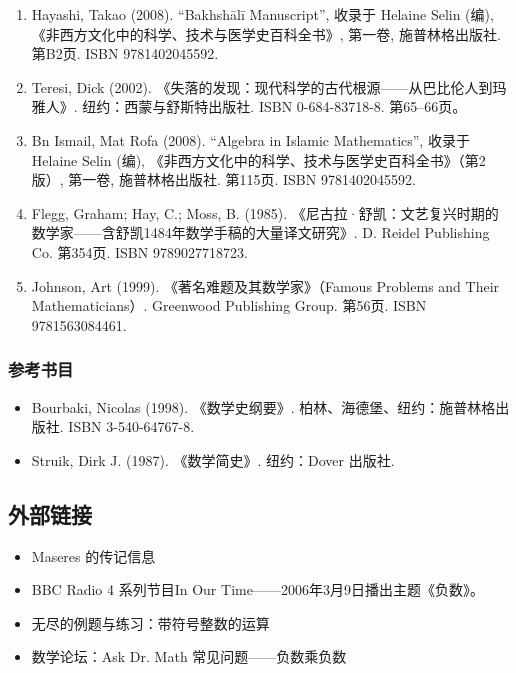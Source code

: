 \begin{enumerate}
\item Hayashi, Takao (2008). “Bakhshālī Manuscript”, 收录于 Helaine Selin (编), 《非西方文化中的科学、技术与医学史百科全书》, 第一卷, 施普林格出版社. 第B2页. ISBN 9781402045592.
\item Teresi, Dick (2002). 《失落的发现：现代科学的古代根源——从巴比伦人到玛雅人》. 纽约：西蒙与舒斯特出版社. ISBN 0-684-83718-8. 第65–66页。
\item Bn Ismail, Mat Rofa (2008). “Algebra in Islamic Mathematics”, 收录于 Helaine Selin (编), 《非西方文化中的科学、技术与医学史百科全书》（第2版）, 第一卷, 施普林格出版社. 第115页. ISBN 9781402045592.
\item Flegg, Graham; Hay, C.; Moss, B. (1985). 《尼古拉·舒凯：文艺复兴时期的数学家——含舒凯1484年数学手稿的大量译文研究》. D. Reidel Publishing Co. 第354页. ISBN 9789027718723.
\item Johnson, Art (1999). 《著名难题及其数学家》（Famous Problems and Their Mathematicians）. Greenwood Publishing Group. 第56页. ISBN 9781563084461.
\end{enumerate}
\subsubsection{参考书目}
\begin{itemize}
\item Bourbaki, Nicolas (1998). 《数学史纲要》. 柏林、海德堡、纽约：施普林格出版社. ISBN 3-540-64767-8.
\item Struik, Dirk J. (1987). 《数学简史》. 纽约：Dover 出版社.
\end{itemize}
\subsection{外部链接}
\begin{itemize}
\item Maseres 的传记信息
\item BBC Radio 4 系列节目In Our Time——2006年3月9日播出主题《负数》。
\item 无尽的例题与练习：带符号整数的运算
\item 数学论坛：Ask Dr. Math 常见问题——负数乘负数
\end{itemize}
